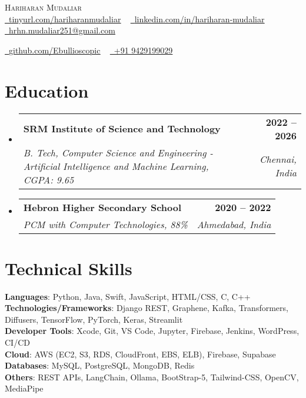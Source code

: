 \documentclass[letterpaper,11pt]{article}
\makeatletter
\newcommand{\resumeSubheading}[4]{
  \vspace{-2pt}\item
    \begin{tabular*}{1.0\textwidth}[t]{l@{\extracolsep{\fill}}r}
      \textbf{#1} & \textbf{\small #2} \\
      \textit{\small#3} & \textit{\small #4} \\
    \end{tabular*}\vspace{-7pt}
}
\newcommand{\resumeSubHeadingListStart}{\begin{itemize}[leftmargin=0.0in, label={}]}
\newcommand{\resumeSubHeadingListEnd}{\end{itemize}}
\makeatother
\begin{document}
\begin{center}
    {\Huge \scshape Hariharan Mudaliar} \\ \vspace{1pt}
    \href{https://tinyurl.com/hariharanmudaliar}{\raisebox{-0.2\height}\faLink\ \underline{tinyurl.com/hariharanmudaliar}} ~
    \href{https://linkedin.com/in/hariharan-mudaliar}{\raisebox{-0.2\height}\faLinkedin\ \underline{linkedin.com/in/hariharan-mudaliar}} ~
    \href{mailto:hrhn.mudaliar251@gmail.com}{\raisebox{-0.2\height}\faEnvelope\ \underline{hrhn.mudaliar251@gmail.com}} ~
    
    \href{https://github.com/Ebullioscopic}{\raisebox{-0.2\height}\faGithub\ \underline{github.com/Ebullioscopic}} ~
    \href{tel:+919429199029}{\raisebox{-0.2\height}\faPhone\ +91 9429199029}
\end{center}

\section{Education}
\resumeSubHeadingListStart
  \resumeSubheading
    {SRM Institute of Science and Technology}{2022 -- 2026}
    {B. Tech, Computer Science and Engineering - Artificial Intelligence and Machine Learning, CGPA: 9.65}{Chennai, India}
\resumeSubHeadingListEnd

\resumeSubHeadingListStart
  \resumeSubheading
    {Hebron Higher Secondary School}{2020 -- 2022}
    {PCM with Computer Technologies, 88\%}{Ahmedabad, India}
\resumeSubHeadingListEnd


\section{Technical Skills}
 \begin{itemize}[leftmargin=0.15in, label={}]
    \small{\item{
     \textbf{Languages}{: Python, Java, Swift, JavaScript, HTML/CSS, C, C++} \\
     \textbf{Technologies/Frameworks}{: Django REST, Graphene, Kafka, Transformers, Diffusers, TensorFlow, PyTorch, Keras, Streamlit} \\
     \textbf{Developer Tools}{: Xcode, Git, VS Code, Jupyter, Firebase, Jenkins, WordPress, CI/CD} \\
     \textbf{Cloud}{: AWS (EC2, S3, RDS, CloudFront, EBS, ELB), Firebase, Supabase} \\
     \textbf{Databases}{: MySQL, PostgreSQL, MongoDB, Redis} \\
     \textbf{Others}{: REST APIs, LangChain, Ollama, BootStrap-5, Tailwind-CSS, OpenCV, MediaPipe} \\
    }}
 \end{itemize}
\end{document}
